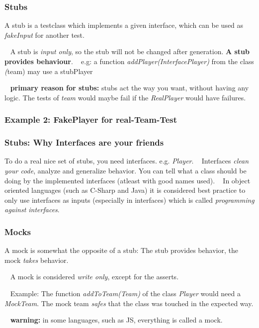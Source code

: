 \documentclass[12pt]{beamer}
\begin{document}
	\begin{frame}
		\frametitle{Stubs}
		A stub is a testclass which implements a given interface, which can be used as \textit{fakeInput} for another test. 
		
		~\newline
		A stub is \textit{input only}, so the stub will not be changed after generation. \textbf{A stub provides behaviour}. 
		~\newline
		e.g: a function \textit{addPlayer(InterfacePlayer)} from the class \textit(team) may use a stubPlayer
		
		~\newline
		\textbf{primary reason for stubs:} stubs act the way you want, without having any logic. The tests of \textit{team} would maybe fail if the \textit{RealPlayer} would have failures. 
	\end{frame}

	\begin{frame}
		\frametitle{Example 2: FakePlayer for real-Team-Test}
		
	\end{frame}
	
	\begin{frame}
		\frametitle{Stubs: Why Interfaces are your friends}
		To do a real nice set of stubs, you need interfaces. e.g. \textit{Player}. 
		~\newline
		Interfaces \textit{clean your code}, analyze and generalize behavior. You can tell what a class should be doing by the implemented interfaces (atleast with good names used).
		~\newline
		In object oriented languages (such as C-Sharp and Java) it is considered best practice to only use interfaces as inputs (especially in interfaces) which is called \textit{programming against interfaces}.
	\end{frame} 

	\begin{frame}
		\frametitle{Mocks}
		A mock is somewhat the opposite of a stub: 
		The stub provides behavior, the mock \textit{takes} behavior.
		
		~\newline
		A mock is considered \textit{write only}, except for the asserts. 
		
		~\newline
		Example: The function \textit{addToTeam(Team)} of the class \textit{Player} would need a \textit{MockTeam}. 
		The mock team \textit{safes} that the class was touched in the expected way.
		
		~\newline
		\textbf{warning:} in some languages, such as JS, everything is called a mock. 
	\end{frame}
\end{document}
